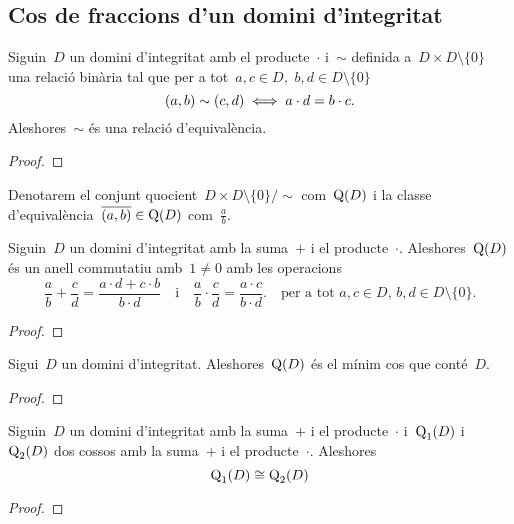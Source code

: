 \documentclass[../../main.tex]{subfiles}
\begin{document}
    \subsection{Cos de fraccions d'un domini d'integritat}
    \begin{proposition}
        \label{prop:relació d'equivalència cos de fraccions}
        Siguin~\(D\) un domini d'integritat amb el producte~\(\cdot\) i~\(\sim\) definida a~\(D\times D\setminus\{0\}\) una relació binària tal que per a tot~\(a,c\in D\),~\(b,d\in D\setminus\{0\}\)
        \[
            (a,b)\sim(c,d)\iff a\cdot d=b\cdot c.
        \]
        Aleshores~\(\sim\) és una relació d'equivalència.
        \begin{proof}
        \end{proof}
    \end{proposition}
    \begin{notation}
        Denotarem el conjunt quocient~\(D\times D\setminus\{0\}/\sim\) com~\(\operatorname{Q}(D)\) i la classe d'equivalència~\(\overline{(a,b)}\in\operatorname{Q}(D)\) com~\(\frac{a}{b}\).
    \end{notation}
    \begin{lemma}
        \label{lema:cos de fraccions}
        Siguin~\(D\) un domini d'integritat amb la suma~\(+\) i el producte~\(\cdot\).
        Aleshores~\(\operatorname{Q}(D)\) és un anell commutatiu amb~\(1\neq0\) amb les operacions
        \[
            \frac{a}{b}+\frac{c}{d}=\frac{a\cdot d+c\cdot b}{b\cdot d}\quad\text{i}\quad\frac{a}{b}\cdot\frac{c}{d}=\frac{a\cdot c}{b\cdot d}.\quad\text{per a tot }a,c\in D\text{, }b,d\in D\setminus\{0\}.
        \]
        \begin{proof}
        \end{proof}
    \end{lemma}
    \begin{theorem}
        \label{thm:cos de fraccions}
        Sigui~\(D\) un domini d'integritat.
        Aleshores~\(\operatorname{Q}(D)\) és el mínim cos que conté~\(D\).
        \begin{proof}
        \end{proof}
    \end{theorem}
    \begin{theorem}
        \label{thm:unicitat del cos de fraccions d'un domini}
        Siguin~\(D\) un domini d'integritat amb la suma~\(+\) i el producte~\(\cdot\) i~\(\operatorname{Q}_{1}(D)\) i~\(\operatorname{Q}_{2}(D)\) dos cossos  amb la suma~\(+\) i el producte~\(\cdot\).
        Aleshores
        \[
            \operatorname{Q}_{1}(D)\cong\operatorname{Q}_{2}(D)
        \]
        \begin{proof}
        \end{proof}
    \end{theorem}
\end{document}
